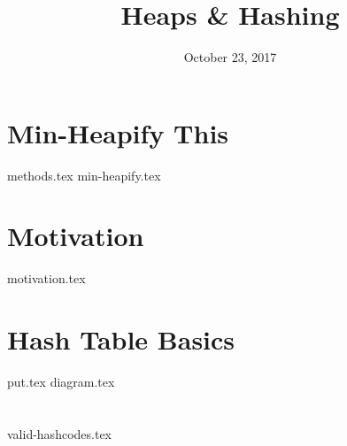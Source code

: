 \documentclass[11pt]{exam}
\title{Heaps \& Hashing}
\date{October 23, 2017}
\begin{document}
\maketitle

\section{Min-Heapify This}
\begin{questions}
{methods.tex}
{min-heapify.tex}
\end{questions}

\section{Motivation}
\begin{questions}
{motivation.tex}
\end{questions}

\section{Hash Table Basics}
\begin{questions}
{put.tex}
{diagram.tex}
\end{questions}

\section{}
\begin{questions}
{valid-hashcodes.tex}
\end{questions}
\end{document}
